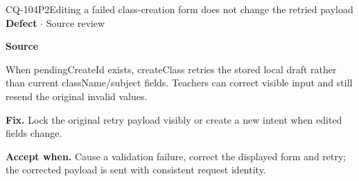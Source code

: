 \begin{finding}{CQ-104}{P2}{Editing a failed class-creation form does not change the retried payload}
\textbf{Defect} $\cdot$ Source review\par
\textbf{Source}\quad{}\par
When pendingCreateId exists, createClass retries the stored local draft rather than current className/subject fields. Teachers can correct visible input and still resend the original invalid values.\par
\textbf{Fix.} Lock the original retry payload visibly or create a new intent when edited fields change.\par
\textbf{Accept when.} Cause a validation failure, correct the displayed form and retry; the corrected payload is sent with consistent request identity.
\end{finding}
\clearpage
